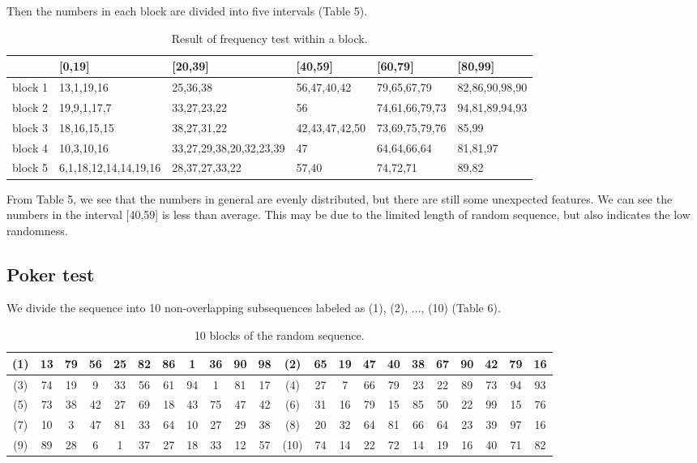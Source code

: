 \documentclass[a4paper]{article}
\begin{document}
	Then the numbers in each block are divided into five intervals (Table 5).
	
	\begin{table}[H]
	\centering
	\begin{tabular}{|c|l|l|l|l|l|}
	\hline
	&[0,19]&[20,39]&[40,59]&[60,79]&[80,99]\\
	\hline
	block 1&13,1,19,16&25,36,38&56,47,40,42&79,65,67,79&82,86,90,98,90\\
	\hline
	block 2&19,9,1,17,7&33,27,23,22&56&74,61,66,79,73&94,81,89,94,93\\
	\hline
	block 3&18,16,15,15&38,27,31,22&42,43,47,42,50&73,69,75,79,76&85,99\\
	\hline
	block 4&10,3,10,16&33,27,29,38,20,32,23,39&47&64,64,66,64&81,81,97\\
	\hline
	block 5&6,1,18,12,14,14,19,16&28,37,27,33,22&57,40&74,72,71&89,82\\
	\hline
	
	\end{tabular}
	\caption{Result of frequency test within a block.}
	\end{table}		
	
	From Table 5, we see that the numbers in general are evenly distributed, but there are still some unexpected features. We can see the numbers in the interval [40,59] is less than average. This may be due to the limited length of random sequence, but also indicates the low randomness.
	
	\subsection{Poker test}
	
	We divide the sequence into 10 non-overlapping subsequences labeled as (1), (2), ..., (10) (Table 6).
	
	\begin{table}[H]
	\centering
	\begin{tabular}{|c|cccccccccc||c|cccccccccc|}
	\hline
(1) & 13 & 79 & 56 & 25 & 82 & 86 & 1  & 36 & 90 & 98&(2) & 65 & 19 & 47 & 40 & 38 & 67 & 90 & 42 & 79 & 16 \\	\hline
(3) & 74 & 19 & 9  & 33 & 56 & 61 & 94 & 1  & 81 & 17&(4) & 27 & 7  & 66 & 79 & 23 & 22 & 89 & 73 & 94 & 93 \\	\hline
(5) & 73 & 38 & 42 & 27 & 69 & 18 & 43 & 75 & 47 & 42 &(6)& 31 & 16 & 79 & 15 & 85 & 50 & 22 & 99 & 15 & 76 \\	\hline
(7) & 10 & 3  & 47 & 81 & 33 & 64 & 10 & 27 & 29 & 38&(8) & 20 & 32 & 64 & 81 & 66 & 64 & 23 & 39 & 97 & 16 \\	\hline
(9) & 89 & 28 & 6  & 1  & 37 & 27 & 18 & 33 & 12 & 57 &(10)& 74 & 14 & 22 & 72 & 14 & 19 & 16 & 40 & 71 & 82 \\ \hline
\end{tabular}
\caption{10 blocks of the random sequence.}
\end{table}
	
\end{document}
